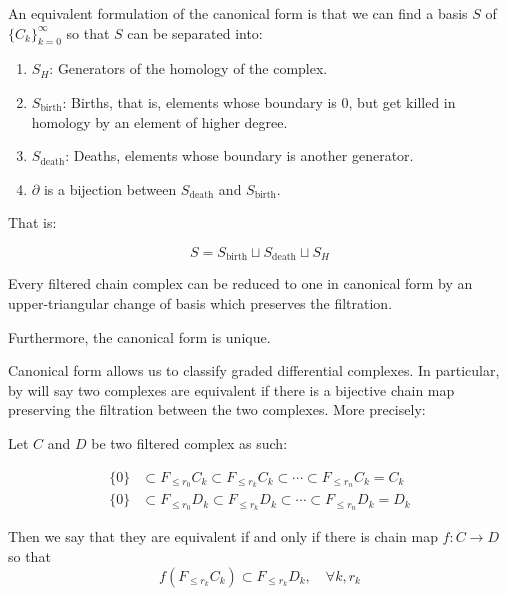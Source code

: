\begin{remark}
\label{canonicalformsplit}
An equivalent formulation of the canonical form is that we can find a basis $S$ 
of $\{C_k\}_{k=0}^{\infty}$ so that $S$
can be separated into: 
\begin{enumerate}
\item $S_H$: Generators of the homology of the complex.

\item $S_{\text{birth}}$: Births, that is, elements whose boundary is $0$, but get killed in homology by an element of higher degree.

\item $S_{\text{death}}$: Deaths, elements whose boundary is another generator. 

\item $\partial$ is a bijection between $S_{\text{death}}$ 
and $S_{\text{birth}}$.
\end{enumerate}

That is:

$$
S=S_{\text{birth}}\sqcup
S_{\text{death}}\sqcup
 S_H
$$ 
\end{remark}

\begin{theorem}
\cite{bar1994}
\label{canonicalform}
Every filtered chain complex can be reduced to 
one in canonical form by an upper-triangular change of basis
which preserves the filtration.

Furthermore, the canonical form is unique.
\end{theorem}

%

%
%
%

Canonical form allows us to classify graded differential complexes.
In particular, by will say two complexes are equivalent if
there is a bijective chain map
preserving the filtration between the two complexes.
More precisely:

\begin{definition}
Let $C$ and $D$ be two filtered complex as such:

\begin{align*}
\{0\}
&\subset
F_{\leq r_0}C_k
\subset
F_{\leq r_k}C_k
\subset
\cdots
\subset
F_{\leq r_n}C_k
=
C_k
\\
\{0\}
&\subset
F_{\leq r_0}D_k
\subset
F_{\leq r_k}D_k
\subset
\cdots
\subset
F_{\leq r_n}D_k
=
D_k
\end{align*}

Then we say that they are equivalent if and only if
there is chain map $f:C \to D$ so that
$$
f\left(
F_{\leq r_k}C_k
\right)
\subset
F_{\leq r_k}D_k, \quad\forall k,r_k
$$

\end{definition}

